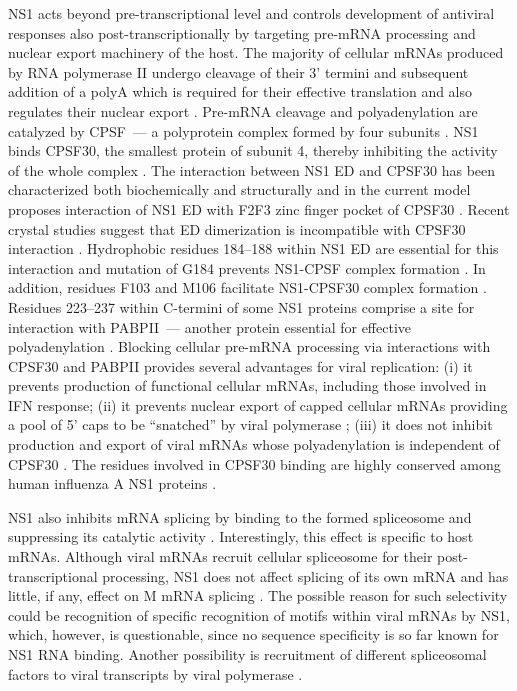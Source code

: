 		NS1 acts beyond pre-transcriptional level and controls development of antiviral responses also  post-transcriptionally by targeting pre-mRNA processing and nuclear export machinery of the host.
		The majority of cellular mRNAs produced by RNA polymerase II undergo cleavage of their 3' termini and subsequent addition of a \gls{polyA} which is required for their effective translation and also regulates their nuclear export \parencite{Vassalli1989, Zarkower1987, Huang1996}. Pre-mRNA cleavage and polyadenylation are catalyzed by \gls{CPSF}~--- a polyprotein complex formed by four subunits \parencite{Wilusz1990, Colgan1997}. NS1 binds \gls{CPSF}30, the smallest protein of subunit 4, thereby inhibiting the activity of the whole complex \parencite{Nemeroff1998}. The interaction between NS1 \gls{ED} and \gls{CPSF}30 has been  characterized both biochemically and structurally and in the current model proposes interaction of NS1 ED with F2F3 zinc finger pocket of \gls{CPSF}30 \parencite{Noah2003, Twu2006, Kochs2007, Das2008}. Recent crystal studies suggest that ED dimerization is incompatible with \gls{CPSF}30 interaction \parencite{Aramini2011, Kerry2011}. Hydrophobic residues 184--188 within NS1 ED are essential for this interaction and mutation of G184 prevents NS1-CPSF complex formation \parencite{Das2008}. In addition, residues F103 and M106 facilitate NS1-CPSF30 complex formation \parencite{Kochs2007, Das2008}. Residues 223--237 within C-termini of some \gls{NS1} proteins comprise a site for interaction with \gls{PABP}II~--- another protein essential for effective polyadenylation \parencite{Li2001a}. Blocking cellular pre-mRNA processing via interactions with \gls{CPSF}30 and \gls{PABP}II provides several advantages for viral replication: (i) it prevents production of functional cellular mRNAs, including those involved in \gls{IFN} response; (ii) it prevents nuclear export of capped cellular mRNAs providing a pool of 5' caps to be ``snatched'' by viral polymerase \parencite{Nemeroff1998}; (iii) it does not inhibit production and export of viral mRNAs whose polyadenylation is independent of \gls{CPSF}30 \parencite{Plotch1977}. The residues involved in \gls{CPSF}30 binding are highly conserved among human influenza A NS1 proteins \parencite{Kochs2007, Das2008}. 
			
		NS1 also inhibits mRNA splicing by binding to the formed spliceosome and suppressing its catalytic activity \parencite{Lu1994, Qiu1995}. Interestingly, this effect is specific to host mRNAs. Although viral mRNAs recruit cellular spliceosome for their post-transcriptional processing, NS1 does not affect splicing of its own mRNA \parencite{Robb2010} and has little, if any, effect on M mRNA splicing \parencite{Salvatore2002, Robb2012}. The possible reason for such selectivity could be recognition of specific recognition of motifs within viral mRNAs by NS1, which, however, is questionable, since no sequence specificity is so far known for NS1 RNA binding. Another possibility is recruitment of different spliceosomal factors to viral transcripts by viral polymerase \parencite{Fournier2014}.
		
